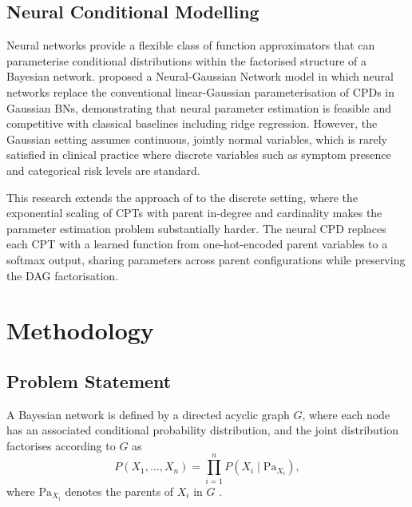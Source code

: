 \documentclass[a4paper,fleqn]{cas-dc}
\newcommand{\Pa}{\mathrm{Pa}}
\begin{document}
\subsection{Neural Conditional Modelling}

Neural networks provide a flexible class of function approximators that can parameterise conditional distributions within the factorised structure of a Bayesian network. \citet{Gaogle2026} proposed a Neural-Gaussian Network model in which neural networks replace the conventional linear-Gaussian parameterisation of CPDs in Gaussian BNs, demonstrating that neural parameter estimation is feasible and competitive with classical baselines including ridge regression. However, the Gaussian setting assumes continuous, jointly normal variables, which is rarely satisfied in clinical practice where discrete variables such as symptom presence and categorical risk levels are standard.

This research extends the approach of \citet{Gaogle2026} to the discrete setting, where the exponential scaling of CPTs with parent in-degree and cardinality makes the parameter estimation problem substantially harder. The neural CPD replaces each CPT with a learned function from one-hot-encoded parent variables to a softmax output, sharing parameters across parent configurations while preserving the DAG factorisation.

\section{Methodology}\label{sec:method}

\subsection{Problem Statement}

A Bayesian network is defined by a directed acyclic graph $G$, where each node has an associated conditional probability distribution, and the joint distribution factorises according to $G$ as
\begin{equation*}
P(X_1,\dots,X_n)=\prod_{i=1}^{n} P(X_i\mid\Pa_{X_i}),
\end{equation*}
where $\Pa_{X_i}$ denotes the parents of $X_i$ in $G$ \citep{koller2007graphical}.
\end{document}
